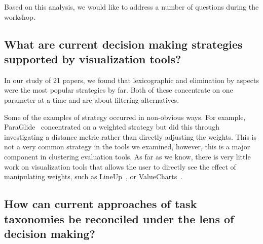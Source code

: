 Based on this analysis, we would like to address a number of questions during the workshop.

\subsection{What are current decision making strategies supported by visualization tools?}

In our study of 21 papers, we found that lexicographic and elimination by aspects were the most popular strategies
by far. Both of these concentrate on one parameter at a time and are
about filtering alternatives.

Some of the examples of strategy occurred in non-obvious ways.  For example,
ParaGlide~\citep{Bergner:2013} concentrated on a
weighted strategy but did this through
investigating a distance metric rather than directly adjusting the
weights. This is not a very common strategy in the tools we examined, however,
this is a major component in clustering evaluation tools.
As far as we know, there is 
very little work on visualization tools that allows the user to directly see the
effect of manipulating weights, such as LineUp~\citep{Gratzl:2013}, or 
ValueCharts~\citep{Carenini:2004}.




\subsection{How can current approaches of task taxonomies be reconciled under the lens of decision making?}


